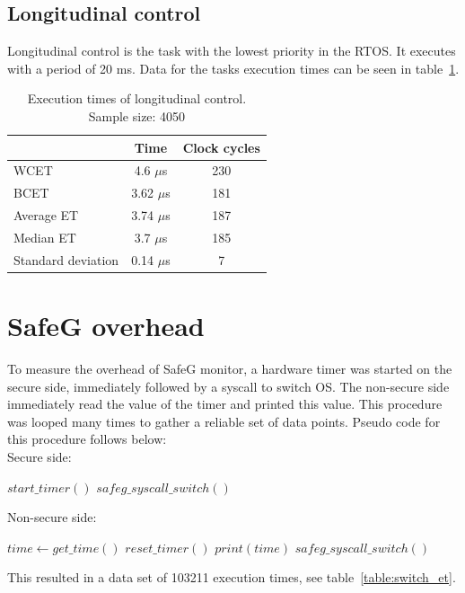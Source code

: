 \subsection{Longitudinal control}
Longitudinal control is the task with the lowest priority in the RTOS. It executes with a period of 20 ms. Data for the tasks execution times can be seen in table~\ref{table:longitudinal_control}.

\begin{table}[H]
\centering
\begin{tabular}{|l|c|c|}
\hline
 & Time & Clock cycles \\ \hline
WCET & 4.6 $\mu$s & 230 \\ \hline
BCET & 3.62 $\mu$s & 181 \\ \hline
Average ET & 3.74 $\mu$s & 187 \\ \hline
Median ET & 3.7 $\mu$s & 185 \\ \hline
Standard deviation & 0.14 $\mu$s & 7 \\ \hline
\end{tabular}
\caption{Execution times of longitudinal control. Sample size: 4050}
\label{table:longitudinal_control}
\end{table}

\section{SafeG overhead}
To measure the overhead of SafeG monitor, a hardware timer was started on the secure side, immediately followed by a syscall to switch OS. The non-secure side immediately read the value of the timer and printed this value. This procedure was looped many times to gather a reliable set of data points. Pseudo code for this procedure follows below:\\

Secure side:
\begin{algorithmic}
\Loop
	\State $start\_timer()$
	\State $safeg\_syscall\_switch()$
\EndLoop
\end{algorithmic}

Non-secure side:
\begin{algorithmic}
\Loop
	\State $time\gets get\_time()$
	\State $reset\_timer()$
	\State $print(time)$
	\State $safeg\_syscall\_switch()$
\EndLoop
\end{algorithmic}


This resulted in a data set of 103211 execution times, see table~\ref{table:switch_et}.

